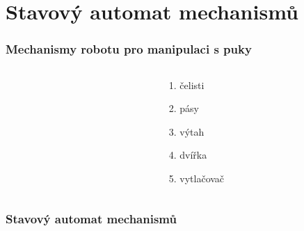 \documentclass[notes=false,pdftex]{beamer}
\begin{document}

\section{Stavový automat mechanismů}
\begin{frame}
	\frametitle{Mechanismy robotu pro manipulaci s puky}

	\begin{columns}[T]
		\begin{column}{0.75\textwidth}
		\end{column}
		\begin{column}{0.25\textwidth}
			\begin{itemize}
				\item[1.] čelisti
				\item[2.] pásy
				\item[3.] výtah
				\item[4.] dvířka
				\item[5.] vytlačovač
			\end{itemize}
		\end{column}
	\end{columns}

\end{frame}


\begin{frame}[label=diagram]
	\frametitle{Stavový automat mechanismů}

	\vspace{3ex}
	\centering
	\hyperlink{code}{}
	
\end{frame}

\end{document}
